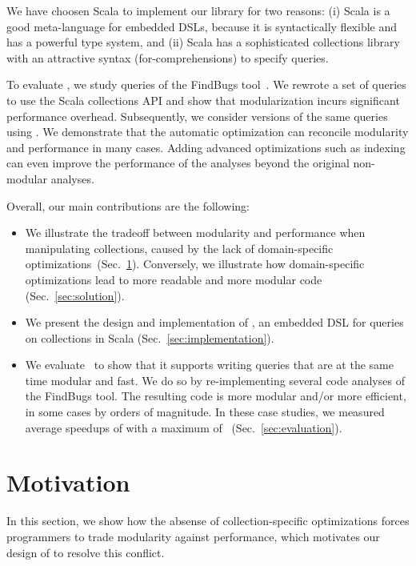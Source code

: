 We have choosen Scala \citep{Odersky11book} to implement our library for two reasons: (i) Scala is a good meta-language for embedded DSLs, because it is syntactically
flexible and has a powerful type system, and (ii) Scala has a sophisticated collections library with an attractive syntax (for-comprehensions) to specify queries.

To evaluate \LoS, we study queries of the FindBugs tool~\citep{DBLP:journals/sigplan/HovemeyerP04}.
We rewrote a set of queries to use the Scala collections API and show that  modularization incurs significant performance overhead. Subsequently, we consider versions of the same queries using \LoS{}. 
We demonstrate that the automatic optimization can reconcile modularity and performance in many cases. Adding advanced optimizations such as indexing can even improve the performance of the analyses beyond the original non-modular analyses.
 
Overall, our main contributions are the following:
\begin{itemize}
\item We illustrate the tradeoff between modularity and performance when manipulating collections, caused by the lack of domain-specific optimizations~(Sec.~\ref{sec:motivation}). Conversely, we illustrate how domain-specific optimizations lead to more readable and more modular code (Sec.~\ref{sec:solution}).
\item We present the design and implementation of \LoS, an embedded DSL for queries on collections in Scala (Sec.~\ref{sec:implementation}).
 \item We evaluate \LoS\ to show that it supports writing queries that are at the same time modular and fast. We do so by re-implementing several code analyses of the FindBugs tool.
 The resulting code is more modular and/or more efficient, in some cases by orders of magnitude.
 In these case studies, we measured average speedups of \avgSpeedupT{} with a maximum of \maxSpeedupT{}~(Sec.~\ref{sec:evaluation}).
\end{itemize}

\section{Motivation}
\label{sec:motivation}

In this section, we show how the absense of collection-specific optimizations
forces programmers to trade modularity against performance, which motivates our design of {\LoS} to resolve this conflict.

